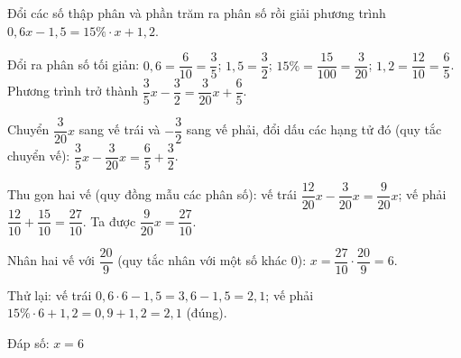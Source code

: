 \begin{problem}[8DS-PT1-023]
Đổi các số thập phân và phần trăm ra phân số rồi giải phương trình $0{,}6x - 1{,}5 = 15\% \cdot x + 1{,}2$.

\begin{solution}
Đổi ra phân số tối giản: $0{,}6 = \dfrac{6}{10} = \dfrac{3}{5}$; $1{,}5 = \dfrac{3}{2}$; $15\% = \dfrac{15}{100} = \dfrac{3}{20}$; $1{,}2 = \dfrac{12}{10} = \dfrac{6}{5}$. Phương trình trở thành $\dfrac{3}{5}x - \dfrac{3}{2} = \dfrac{3}{20}x + \dfrac{6}{5}$.

Chuyển $\dfrac{3}{20}x$ sang vế trái và $-\dfrac{3}{2}$ sang vế phải, đổi dấu các hạng tử đó (quy tắc chuyển vế): $\dfrac{3}{5}x - \dfrac{3}{20}x = \dfrac{6}{5} + \dfrac{3}{2}$.

Thu gọn hai vế (quy đồng mẫu các phân số): vế trái $\dfrac{12}{20}x - \dfrac{3}{20}x = \dfrac{9}{20}x$; vế phải $\dfrac{12}{10} + \dfrac{15}{10} = \dfrac{27}{10}$. Ta được $\dfrac{9}{20}x = \dfrac{27}{10}$.

Nhân hai vế với $\dfrac{20}{9}$ (quy tắc nhân với một số khác $0$): $x = \dfrac{27}{10} \cdot \dfrac{20}{9} = 6$.

Thử lại: vế trái $0{,}6 \cdot 6 - 1{,}5 = 3{,}6 - 1{,}5 = 2{,}1$; vế phải $15\% \cdot 6 + 1{,}2 = 0{,}9 + 1{,}2 = 2{,}1$ (đúng).

Đáp số: $\boxed{x = 6}$
\end{solution}
\end{problem}

